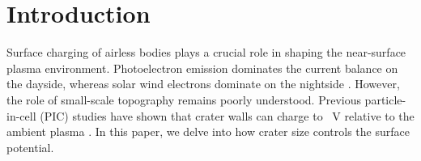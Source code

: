 \section{Introduction}
\label{sec:intro}
Surface charging of airless bodies plays a crucial role in shaping the near-surface plasma environment.
Photoelectron emission dominates the current balance on the dayside, whereas solar wind electrons dominate on the nightside \cite{Whipple1981,Nitter1998}.
However, the role of small-scale topography remains poorly understood.
Previous particle-in-cell (PIC) studies have shown that crater walls can charge to \wallPot{}~V relative to the ambient plasma \cite{Zimmerman2016}.
In this paper, we delve into how crater size controls the surface potential.
